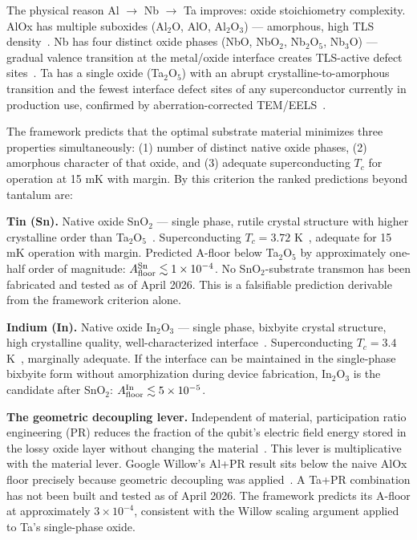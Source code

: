 \documentclass[12pt,a4paper]{article}
\begin{document}
The physical reason Al $\to$ Nb $\to$ Ta improves: oxide stoichiometry
complexity. AlOx has multiple suboxides (Al$_2$O, AlO, Al$_2$O$_3$) ---
amorphous, high TLS density~\cite{Martinis2005,Muller2019}. Nb has four
distinct oxide phases (NbO, NbO$_2$, Nb$_2$O$_5$, Nb$_3$O) --- gradual
valence transition at the metal/oxide interface creates TLS-active defect
sites~\cite{IBM2021Nb}. Ta has a single oxide (Ta$_2$O$_5$) with an abrupt
crystalline-to-amorphous transition and the fewest interface defect sites of
any superconductor currently in production use, confirmed by
aberration-corrected TEM/EELS~\cite{Place2021,SQMS2024}.

The framework predicts that the optimal substrate material minimizes
three properties simultaneously: (1) number of distinct native oxide phases,
(2) amorphous character of that oxide, and (3) adequate superconducting $T_c$
for operation at 15 mK with margin. By this criterion the ranked predictions
beyond tantalum are:

\textbf{Tin (Sn).} Native oxide SnO$_2$ --- single phase, rutile crystal
structure with higher crystalline order than Ta$_2$O$_5$~\cite{Baur1956SnO2}.
Superconducting $T_c = 3.72$ K~\cite{Meissner1930Sn}, adequate for 15 mK
operation with margin. Predicted A-floor below Ta$_2$O$_5$ by approximately
one-half order of magnitude:
$A_{\rm floor}^{\rm Sn} \lesssim 1 \times 10^{-4}$.
No SnO$_2$-substrate transmon has been fabricated and tested as of April 2026.
This is a falsifiable prediction derivable from the framework criterion alone.

\textbf{Indium (In).} Native oxide In$_2$O$_3$ --- single phase, bixbyite
crystal structure, high crystalline quality, well-characterized
interface~\cite{Bierwagen2015In2O3}. Superconducting $T_c = 3.4$
K~\cite{Meissner1930In}, marginally adequate. If the interface can be
maintained in the single-phase bixbyite form without amorphization during
device fabrication, In$_2$O$_3$ is the candidate after SnO$_2$:
$A_{\rm floor}^{\rm In} \lesssim 5 \times 10^{-5}$.

\textbf{The geometric decoupling lever.} Independent of material, participation
ratio engineering (PR) reduces the fraction of the qubit's electric field energy
stored in the lossy oxide layer without changing the material~\cite{Wenner2011PR}.
This lever is multiplicative with the material lever. Google Willow's Al+PR
result sits below the naive AlOx floor precisely because geometric decoupling
was applied~\cite{GoogleWillow2024}.
A Ta+PR combination has not been built and tested as of April 2026.
The framework predicts its A-floor at approximately $3 \times 10^{-4}$,
consistent with the Willow scaling argument applied to Ta's single-phase oxide.
\end{document}
